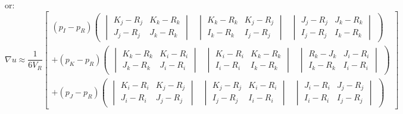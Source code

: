 \documentclass{article}
\begin{document}
or:
	\begin{equation} \label{eq:e5}
		\nabla u \approx \frac{1}{6V_{R}}
		\begin{bmatrix}
		(p_{I} - p_{R})
			\begin{pmatrix}
				\begin{vmatrix}
					K_{j} - R_{j} & K_{k} - R_{k} \\
					J_{j} - R_{j} & J_{k} - R_{k}
				\end{vmatrix} &
				\begin{vmatrix}
					K_{k} - R_{k} & K_{j} - R_{j} \\
					I_{k} - R_{k} & I_{j} - R_{j}
				\end{vmatrix} &
				\begin{vmatrix}
					J_{j} - R_{j} & J_{k} - R_{k} \\
					I_{j} - R_{j} & I_{k} - R_{k}
				\end{vmatrix}
			\end{pmatrix}
		\\
		+ (p_{K} - p_{R})
			\begin{pmatrix}
				\begin{vmatrix}
					K_{k} - R_{k} & K_{i} - R_{i} \\
					J_{k} - R_{k} & J_{i} - R_{i}
				\end{vmatrix} &
				\begin{vmatrix}
					K_{i} - R_{i} & K_{k} - R_{k} \\
					I_{i} - R_{i} & I_{k} - R_{k}
				\end{vmatrix} &
				\begin{vmatrix}
					R_{k} - J_{k} & J_{i} - R_{i} \\
					I_{k} - R_{k} & I_{i} - R_{i}
				\end{vmatrix}
			\end{pmatrix}
		\\
		+ (p_{J} - p_{R})
			\begin{pmatrix}
				\begin{vmatrix}
					K_{i} - R_{i} & K_{j} - R_{j} \\
					J_{i} - R_{i} & J_{j} - R_{j}
				\end{vmatrix} &
				\begin{vmatrix}
					K_{j} - R_{j} & K_{i} - R_{i}\\
					I_{j} - R_{j} & I_{i} - R_{i}
				\end{vmatrix} &
				\begin{vmatrix}
					J_{i} - R_{i} & J_{j} - R_{j} \\
					I_{i} - R_{i} & I_{j} - R_{j}
				\end{vmatrix}
			\end{pmatrix}
		\end{bmatrix}
	\end{equation}
\end{document}
